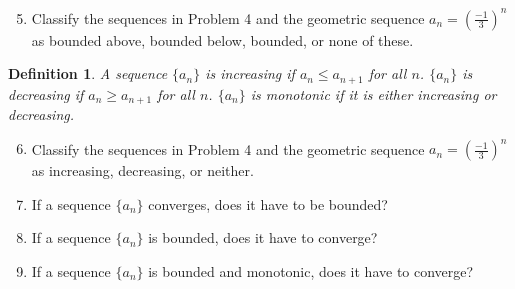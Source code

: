 \documentclass[12pt]{article}
\newtheorem*{defn}{Definition}
\begin{document}
\begin{enumerate}
\setcounter{enumi}{4}
\item Classify the sequences in Problem 4 and the geometric sequence $a_n = (\frac{-1}{3})^n$ as bounded above, bounded below, bounded, or none of these.
\end{enumerate}

\bigskip

\pagebreak

\begin{defn} \rm
A sequence $\{a_n\}$ is \emph{increasing} if $a_n\leq a_{n+1}$ for all $n$.
$\{a_n\}$ is \emph{decreasing} if $a_n\geq a_{n+1}$ for all $n$.
$\{a_n\}$ is \emph{monotonic} if it is either increasing or decreasing.
\end{defn}

\begin{enumerate}
\setcounter{enumi}{5}
\item Classify the sequences in Problem 4 and the geometric sequence $a_n = (\frac{-1}{3})^n$ as increasing, decreasing, or neither.


\vfill

\item If a sequence $\{a_n\}$ converges, does it have to be bounded?

\vfill

\item If a sequence $\{a_n\}$ is bounded, does it have to converge?

\vfill

\item If a sequence $\{a_n\}$ is bounded and monotonic, does it have to converge?
\vfill
\thispagestyle{empty}
\end{enumerate}
\end{document}
